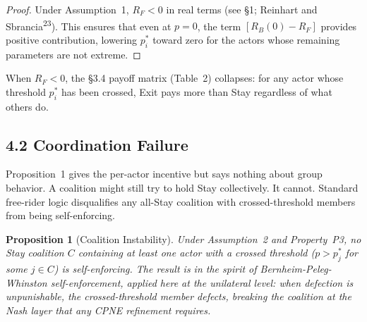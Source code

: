 \documentclass[12pt]{article}
\newtheorem{proposition}{Proposition}
\theoremstyle{definition}
\theoremstyle{remark}
\begin{document}
\begin{proof}
Under Assumption~1, $R_F < 0$ in real terms (see \S1; Reinhart and Sbrancia\textsuperscript{23}). This ensures that even at $p = 0$, the
term $[R_B(0) - R_F]$ provides positive contribution, lowering
$p_i^*$ toward zero for the actors whose remaining parameters are
not extreme.

\end{proof}

\smallskip
\noindent When $R_F < 0$, the \S3.4 payoff matrix (Table~2) collapses: for any actor whose threshold $p_i^*$ has been crossed, Exit pays more than Stay regardless of what others do.

\subsection{4.2 Coordination Failure}

Proposition~1 gives the per-actor incentive but says nothing about
group behavior. A coalition might still try to hold Stay
collectively. It cannot. Standard free-rider logic disqualifies
any all-Stay coalition with crossed-threshold members from being
self-enforcing.

\begin{proposition}[Coalition Instability]
Under Assumption~2 and Property~P3, no Stay coalition $C$
containing at least one actor with a crossed threshold
($p > p_j^*$ for some $j \in C$) is self-enforcing. The result
is in the spirit of Bernheim-Peleg-Whinston self-enforcement,
applied here at the unilateral level: when defection is
unpunishable, the crossed-threshold member defects, breaking the
coalition at the Nash layer that any CPNE refinement requires.
\end{proposition}
\end{document}
